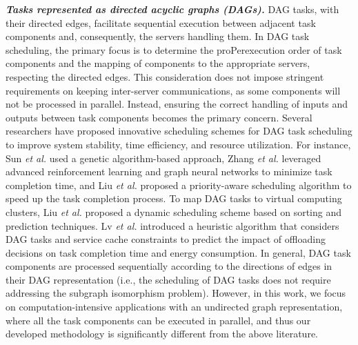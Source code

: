 \noindent
\textit{\textbf{Tasks represented as directed acyclic graphs (DAGs). }}{DAG tasks, with their directed edges, facilitate sequential execution between adjacent task components and, consequently, the servers handling them. In DAG task scheduling, the primary focus is to determine the proPerexecution order of task components and the mapping of components to the appropriate servers, respecting the directed edges. This consideration does not impose stringent requirements on keeping inter-server communications, as some components will not be processed in parallel. Instead, ensuring the correct handling of inputs and outputs between task components becomes the primary concern.} Several researchers have proposed innovative scheduling schemes for DAG task scheduling to improve system stability, time efficiency, and resource utilization. For instance, Sun \textit{et al.} \cite{sun2018cooperative} used a genetic algorithm-based approach, Zhang \textit{et al.} \cite{zhang2022dag} leveraged advanced reinforcement learning and graph neural networks to minimize task completion time, and Liu \textit{et al.} \cite{liu2020dependency} proposed a priority-aware scheduling algorithm to speed up the task completion process. To map DAG tasks to virtual computing clusters, Liu \textit{et al.} \cite{liu2023rfid} proposed a dynamic scheduling scheme based on sorting and prediction techniques. Lv \textit{et al.} \cite{lv2022tbtoa} introduced a heuristic algorithm that considers DAG tasks and service cache constraints to predict the impact of offloading decisions on task completion time and energy consumption. In general, DAG task components are processed sequentially according to the directions of edges in their DAG representation (i.e., the scheduling of DAG tasks does not require addressing the subgraph isomorphism problem). However, in this work, we focus on computation-intensive applications with an undirected graph representation, where all the task components can be executed in parallel, and thus our developed methodology is significantly different from the above literature. 
	
